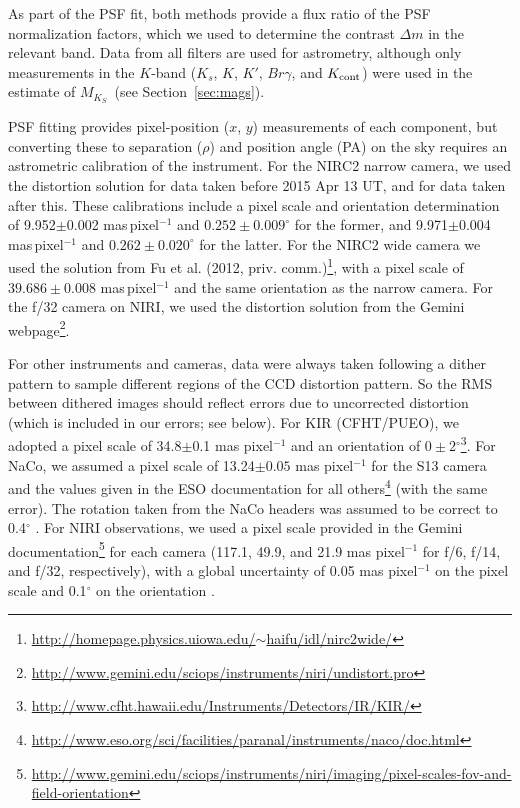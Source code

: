\documentclass[twocolumn]{aastex62}
\newcommand{\mks}{$M_{K_S}$}
\newcommand{\degree}{$^{\circ}$}
\begin{document}
As part of the PSF fit, both methods provide a flux ratio of the PSF normalization factors, which we used to determine the contrast $\Delta m$ in the relevant band. Data from all filters are used for astrometry, although only measurements in the $K$-band ($K_s$, $K$, $K'$, $Br\gamma$, and $K_{\rm{cont}}$) were used in the estimate of \mks\ (see Section~\ref{sec:mags}).

PSF fitting provides pixel-position ($x$, $y$) measurements of each component, but converting these to separation ($\rho$) and position angle (PA) on the sky requires an astrometric calibration of the instrument. For the NIRC2 narrow camera, we used the \citet{Yelda2010} distortion solution for data taken before 2015 Apr 13 UT, and \citet{2016PASP..128i5004S} for data taken after this. These calibrations include a pixel scale and orientation determination of 9.952$\pm$0.002 mas\,pixel$^{-1}$ and $0.252\pm0.009^{\circ}$ for the former, and 9.971$\pm$0.004 mas\,pixel$^{-1}$ and $0.262\pm0.020^{\circ}$ for the latter. For the NIRC2 wide camera we used the solution from Fu et al. (2012, priv. comm.)\footnote{\href{http://homepage.physics.uiowa.edu/~haifu/idl/nirc2wide/}{http://homepage.physics.uiowa.edu/$\sim$haifu/idl/nirc2wide/}}, with a pixel scale of $39.686\pm0.008$ mas\,pixel$^{-1}$ and the same orientation as the narrow camera. For the f/32 camera on NIRI, we used the distortion solution from the Gemini webpage\footnote{\href{http://www.gemini.edu/sciops/instruments/niri/undistort.pro}{http://www.gemini.edu/sciops/instruments/niri/undistort.pro}}. 

For other instruments and cameras, data were always taken following a dither pattern to sample different regions of the CCD distortion pattern. So the RMS between dithered images should reflect errors due to uncorrected distortion (which is included in our errors; see below). For KIR (CFHT/PUEO), we adopted a pixel scale of 34.8$\pm$0.1 mas pixel$^{-1}$ \citep{2003ApJ...589..410S} and an orientation of $0\pm2$\degree \footnote{\href{http://www.cfht.hawaii.edu/Instruments/Detectors/IR/KIR/}{http://www.cfht.hawaii.edu/Instruments/Detectors/IR/KIR/}}. For NaCo, we assumed a pixel scale of 13.24$\pm0.05$ mas pixel$^{-1}$ for the S13 camera \citep{2003A&A...411..157M,2005A&A...435L..13N} and the values given in the ESO documentation for all others\footnote{\href{http://www.eso.org/sci/facilities/paranal/instruments/naco/doc.html}{http://www.eso.org/sci/facilities/paranal/instruments/naco/doc.html}} (with the same error). The rotation taken from the NaCo headers was assumed to be correct to 0.4$^{\circ}$ \citep{Sef2008}. For NIRI observations, we used a pixel scale provided in the Gemini documentation\footnote{\href{http://www.gemini.edu/sciops/instruments/niri/imaging/pixel-scales-fov-and-field-orientation}{http://www.gemini.edu/sciops/instruments/niri/imaging/pixel-scales-fov-and-field-orientation}} for each camera (117.1, 49.9, and 21.9 mas pixel$^{-1}$ for f/6, f/14, and f/32, respectively), with a global uncertainty of 0.05 mas pixel$^{-1}$ on the pixel scale and 0.1$^{\circ}$ on the orientation \citep{2004ApJ...614..235B}. 
\end{document}
